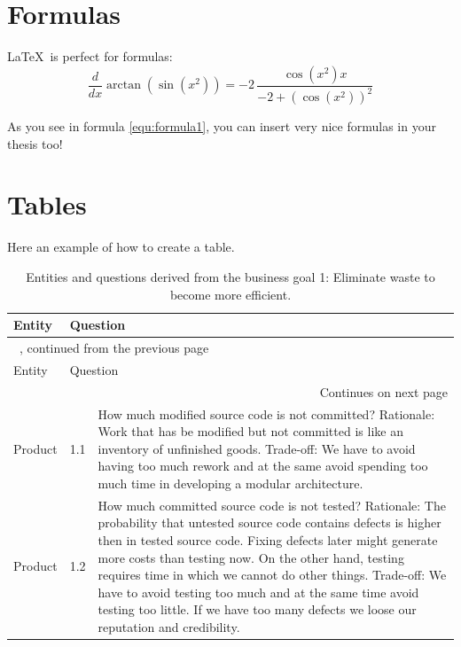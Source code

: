\section{Formulas}
\LaTeX~is perfect for formulas: 
\begin{equation}
	\label{equ:formula1}
	{\frac {d}{dx}}\arctan(\sin({x}^{2}))=-2\,{\frac {\cos({x}^{2})x}{-2+\left (\cos({x}^{2})\right )^{2}}}
\end{equation}

As you see in formula \ref{equ:formula1}, you can insert very nice formulas in your thesis too!

\section{Tables}
Here an example of how to create a table. 

\setlength{\tabcolsep}{6pt}
\begin{longtable}[l]{p{}p{}p{}} %
\caption{Entities and questions derived from the business goal 1: Eliminate waste to become more efficient.} 
\label{tab:50} \\

\hline\noalign{\smallskip}
Entity & \multicolumn{2}{l}{Question} \\[2pt]
\hline
\endfirsthead
 
\multicolumn{3}{l}{\tablename\ \thetable{}, continued from the previous page} \\ %
\hline\noalign{\smallskip}
Entity & \multicolumn{2}{l}{Question} \\[2pt]
\hline
\endhead

\multicolumn{3}{r}{Continues on next page} \\ %
\endfoot

\noalign{\smallskip}\hline\noalign{\smallskip}
\endlastfoot

Product  & 1.1  & How much modified source code is not committed? 
                  \newline Rationale: Work that has be modified but not committed is like an inventory of unfinished goods.  
                  \newline Trade-off: We have to avoid having too much rework and at the same avoid spending too much time in developing a modular architecture. \\\hline
Product  & 1.2  & How much committed source code is not tested? 
                  \newline Rationale: The probability that untested source code contains defects is higher then in tested source code. Fixing defects later might generate more costs than testing now. On the other hand, testing requires time in which we cannot do other things. 
                  \newline Trade-off: We have to avoid testing too much and at the same time avoid testing too little. If we have too many defects we loose our reputation and credibility. \\
\end{longtable}

